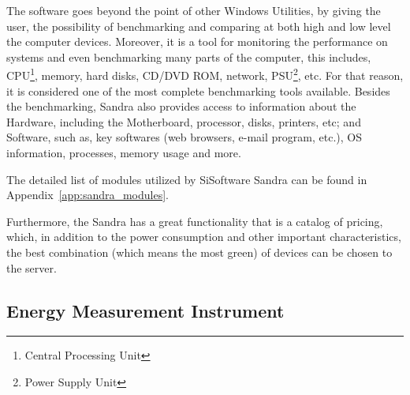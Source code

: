     The software goes beyond the point of other Windows Utilities, by giving the user, the possibility of benchmarking and comparing at both high and low level the computer devices. Moreover, it is a tool for monitoring the performance on systems and even benchmarking many parts of the computer, this includes, CPU\footnote{Central Processing Unit}, memory, hard disks, CD/DVD ROM, network, PSU\footnote{Power Supply Unit}, etc. For that reason, it is considered one of the most complete benchmarking tools available. Besides the benchmarking, Sandra also provides access to information about the Hardware, including the Motherboard, processor, disks, printers, etc; and Software, such as, key softwares (web browsers, e-mail program, etc.), OS information, processes, memory usage and more.
    
    The detailed list of modules utilized by SiSoftware Sandra can be found in Appendix~\ref{app:sandra_modules}.
    
    Furthermore, the Sandra has a great functionality that is a catalog of pricing, which, in addition to the power consumption and other important characteristics, the best combination (which means the most green) of devices can be chosen to the server.
    
\subsection{Energy Measurement Instrument} \label{sec3:energy_measurement_instrument}


